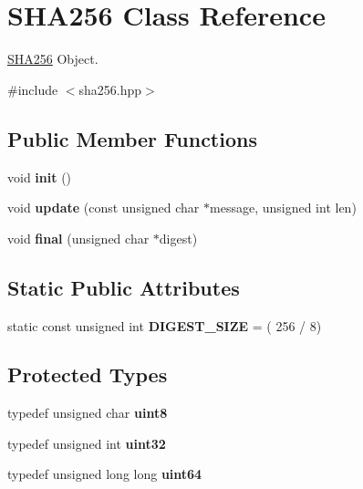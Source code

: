 \hypertarget{class_s_h_a256}{}\section{S\+H\+A256 Class Reference}
\label{class_s_h_a256}


\mbox{\hyperlink{class_s_h_a256}{S\+H\+A256}} Object.  




{\ttfamily \#include $<$sha256.\+hpp$>$}

\subsection*{Public Member Functions}
\begin{DoxyCompactItemize}
\item 
\mbox{\label{class_s_h_a256_a9893152e0b8a75ebed254509dfb1eb4a}} 
void {\bfseries init} ()
\item 
\mbox{\label{class_s_h_a256_a2ab5f18a14b4493671e7d0c4a636b4c6}} 
void {\bfseries update} (const unsigned char $\ast$message, unsigned int len)
\item 
\mbox{\label{class_s_h_a256_ae28a257b66be069cc850d49dfe3d48f9}} 
void {\bfseries final} (unsigned char $\ast$digest)
\end{DoxyCompactItemize}
\subsection*{Static Public Attributes}
\begin{DoxyCompactItemize}
\item 
\mbox{\label{class_s_h_a256_a62ea97291cac7ce713ac2cf69219851b}} 
static const unsigned int {\bfseries D\+I\+G\+E\+S\+T\+\_\+\+S\+I\+ZE} = ( 256 / 8)
\end{DoxyCompactItemize}
\subsection*{Protected Types}
\begin{DoxyCompactItemize}
\item 
\mbox{\label{class_s_h_a256_a2d30c8d80b241471affd735f5f5e9925}} 
typedef unsigned char {\bfseries uint8}
\item 
\mbox{\label{class_s_h_a256_a90dbb66f84c4c8c985aaa099a0ef3b54}} 
typedef unsigned int {\bfseries uint32}
\item 
\mbox{\label{class_s_h_a256_a4c998d0c4b147e28438e6b5749cb987e}} 
typedef unsigned long long {\bfseries uint64}
\end{DoxyCompactItemize}
